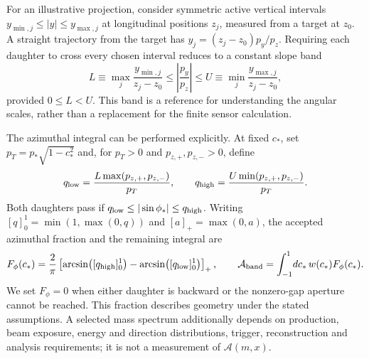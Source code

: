 For an illustrative projection, consider symmetric active
vertical intervals $y_{\min,j}\leq |y|\leq y_{\max,j}$ at longitudinal
positions $z_j$, measured from a target at $z_0$.  A straight trajectory from
the target has $y_j=(z_j-z_0)p_y/p_z$.  Requiring each daughter to cross every
chosen interval reduces to a constant slope band
\begin{equation}
  L\equiv\max_j\frac{y_{\min,j}}{z_j-z_0}
    \leq\left|\frac{p_y}{p_z}\right|\leq
  U\equiv\min_j\frac{y_{\max,j}}{z_j-z_0},
  \label{v571:projected-band}
\end{equation}
provided $0\leq L<U$.  This band is a reference for understanding the angular
scales, rather than a replacement for the finite sensor calculation.

The azimuthal integral can be performed explicitly.  At fixed $c_*$, set
$p_T=p_*\sqrt{1-c_*^2}$ and, for $p_T>0$ and $p_{z,+},p_{z,-}>0$, define
\begin{equation}
  q_{\rm low}=\frac{L\max(p_{z,+},p_{z,-})}{p_T},\qquad
  q_{\rm high}=\frac{U\min(p_{z,+},p_{z,-})}{p_T}.
  \label{v571:azimuth-bounds}
\end{equation}
Both daughters pass if $q_{\rm low}\leq |\sin\phi_*|\leq q_{\rm high}$.
Writing $[q]_0^1=\min(1,\max(0,q))$ and $[a]_+=\max(0,a)$, the accepted
azimuthal fraction and the remaining integral are
\begin{equation}
  F_\phi(c_*)=\frac2\pi
    \left[\arcsin\bigl([q_{\rm high}]_0^1\bigr)-
          \arcsin\bigl([q_{\rm low}]_0^1\bigr)\right]_+,\qquad
  \mathcal A_{\rm band}=\int_{-1}^{1}\!dc_*\,w(c_*)F_\phi(c_*).
  \label{v571:azimuth-fraction}
\end{equation}
We set $F_\phi=0$ when either daughter is backward or the nonzero-gap aperture
cannot be reached.  This fraction describes geometry under the stated
assumptions.  A selected mass spectrum additionally depends on production,
beam exposure, energy and direction distributions, trigger, reconstruction
and analysis requirements; it is not a measurement of $\mathcal A(m,x)$.
